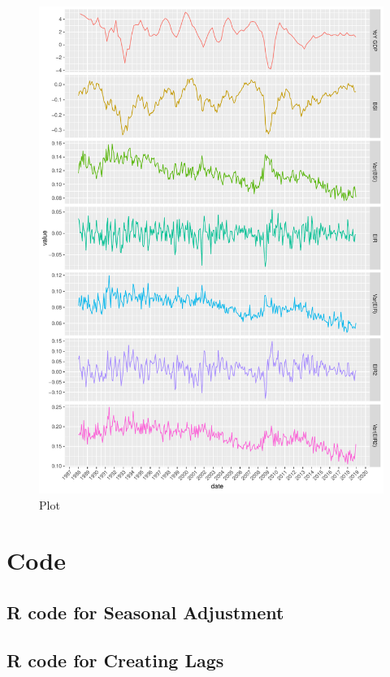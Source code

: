 \documentclass[12pt,a4paper,oneside]{book}
\begin{document}
\begin{figure}[H]
    \centering
    \captionsetup{justification=centering}
    \includegraphics[scale=0.8]{Graphs/variables.pdf}
    \caption{Plot }
    \label{plot:appendix all variables}
\end{figure}


\chapter*{Code}
\section*{R code for Seasonal Adjustment}


\section*{R code for Creating Lags}
\end{document}
